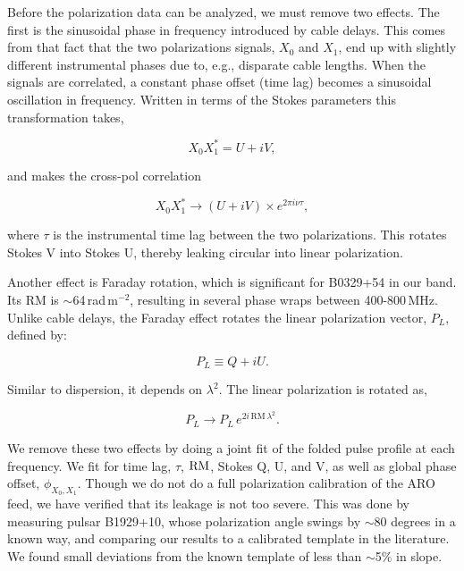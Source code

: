 Before the polarization data can be analyzed, 
we must remove two effects. The first is the 
sinusoidal phase in frequency introduced by cable delays. 
This comes from that fact that the two polarizations signals, 
$X_0$ and $X_1$, end up with slightly different instrumental 
phases due to, e.g., disparate cable lengths. When 
the signals are correlated, a constant phase offset (time lag) 
becomes a sinusoidal oscillation in frequency. 
Written in terms of the Stokes parameters
this transformation takes,

\begin{equation}
X_0 X_1^* = U + iV,
\end{equation}

\noindent and makes the cross-pol correlation

\begin{equation}
X_0 X_1^* \rightarrow \left (U + iV \right) \times e^{2\pi i \nu \tau},
\end{equation}

\noindent where $\tau$ is the instrumental time lag
between the two polarizations. This rotates Stokes V 
into Stokes U, thereby leaking circular into linear polarization.

Another effect is Faraday rotation, which is significant 
for B0329+54 in our band. Its RM is $\sim$64\,rad\,m$^{-2}$, 
resulting in several phase wraps between 400-800\,MHz.
Unlike cable delays, the Faraday effect rotates the 
linear polarization vector, $P_L$, defined by:

\begin{equation}
P_L \equiv Q + iU.
\end{equation}

\noindent Similar to dispersion, it depends on $\lambda^2$.
The linear polarization is rotated as,

\begin{equation}
P_L \rightarrow P_L\, e^{2i\, \textrm{RM} \, \lambda^2}.
\end{equation}

We remove these two effects by doing a joint fit 
of the folded pulse profile at each frequency. We fit 
for time lag, $\tau$, $\rm RM$, Stokes 
Q, U, and V, as well as global phase offset, $\phi_{X_0,X_1}$. 
Though we do not do a full polarization calibration of 
the ARO feed, we have verified that its leakage is 
not too severe. This was done by measuring pulsar 
B1929+10, whose polarization angle swings by $\sim$80 
degrees in a known way, and comparing our results to a
calibrated template in the literature. We found 
small deviations from the known template of 
less than $\sim$5$\%$ in slope.

